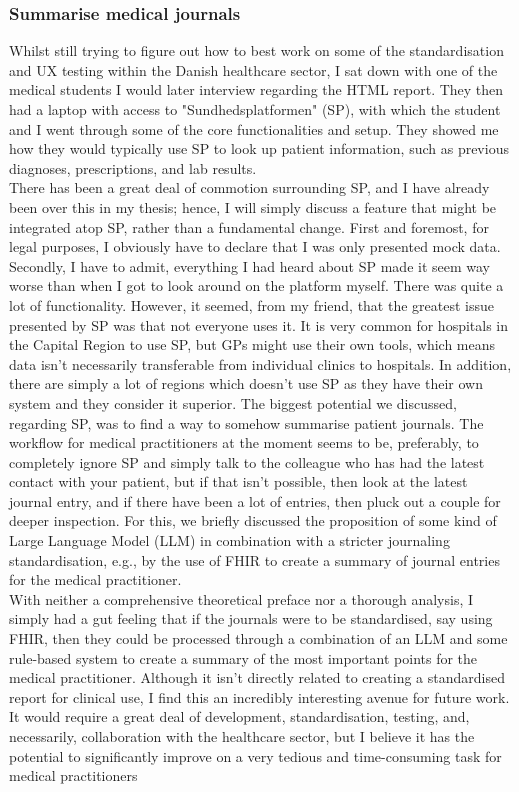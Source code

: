 \subsubsection*{Summarise medical journals}
Whilst still trying to figure out how to best work on some of the standardisation and UX testing within the Danish healthcare sector, I sat down with one of the medical students I would later interview regarding the HTML report. They then had a laptop with access to "Sundhedsplatformen" (SP), with which the student and I went through some of the core functionalities and setup. They showed me how they would typically use SP to look up patient information, such as previous diagnoses, prescriptions, and lab results.
\\
There has been a great deal of commotion surrounding SP, and I have already been over this in my thesis; hence, I will simply discuss a feature that might be integrated atop SP, rather than a fundamental change. First and foremost, for legal purposes, I obviously have to declare that I was only presented mock data. Secondly, I have to admit, everything I had heard about SP made it seem way worse than when I got to look around on the platform myself. There was quite a lot of functionality. However, it seemed, from my friend, that the greatest issue presented by SP was that not everyone uses it. It is very common for hospitals in the Capital Region to use SP, but GPs might use their own tools, which means data isn't necessarily transferable from individual clinics to hospitals. In addition, there are simply a lot of regions which doesn't use SP as they have their own system and they consider it superior. The biggest potential we discussed, regarding SP, was to find a way to somehow summarise patient journals. The workflow for medical practitioners at the moment seems to be, preferably, to completely ignore SP and simply talk to the colleague who has had the latest contact with your patient, but if that isn't possible, then look at the latest journal entry, and if there have been a lot of entries, then pluck out a couple for deeper inspection. For this, we briefly discussed the proposition of some kind of Large Language Model (LLM) in combination with a stricter journaling standardisation, e.g., by the use of FHIR to create a summary of journal entries for the medical practitioner. 
\\
With neither a comprehensive theoretical preface nor a thorough analysis, I simply had a gut feeling that if the journals were to be standardised, say using FHIR, then they could be processed through a combination of an LLM and some rule-based system to create a summary of the most important points for the medical practitioner. Although it isn't directly related to creating a standardised report for clinical use, I find this an incredibly interesting avenue for future work. It would require a great deal of development, standardisation, testing, and, necessarily, collaboration with the healthcare sector, but I believe it has the potential to significantly improve on a very tedious and time-consuming task for medical practitioners